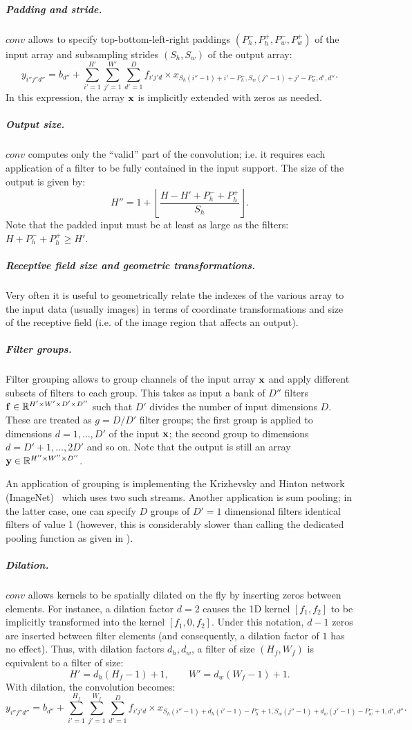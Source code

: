 \subparagraph{Padding and stride.} $conv$ allows to specify  top-bottom-left-right paddings $(P_h^-,P_h^+,P_w^-,P_w^+)$ of the input array and subsampling strides $(S_h,S_w)$ of the output array:
\[
y_{i''j''d''}
=
b_{d''}
+
\sum_{i'=1}^{H'}
\sum_{j'=1}^{W'}
\sum_{d'=1}^D
f_{i'j'd} \times x_{S_h (i''-1)+i'-P_h^-, S_w(j''-1)+j' - P_w^-,d',d''}.
\]
In this expression, the array $\mathbf{x}$ is implicitly extended with zeros as needed.

\subparagraph{Output size.} $conv$ computes only the ``valid'' part of the convolution; i.e. it requires each application of a filter to be fully contained in the input support.  The size of the output is given by:
\[
H'' = 1 + \left\lfloor \frac{H - H' + P_h^- + P_h^+}{S_h} \right\rfloor.
\]
Note that the padded input must be at least as large as the filters: $H +P_h^- + P_h^+ \geq H'$.

\subparagraph{Receptive field size and geometric transformations.} Very often it is useful to geometrically relate the indexes of the various array to the input data (usually images) in terms of coordinate transformations and size of the receptive field (i.e. of the image region that affects an output).

\subparagraph{Filter groups.} Filter grouping allows to group channels of the input array $\mathbf{x}$ and apply different subsets of filters to each group. This takes as input a bank of $D''$ filters $\mathbf{f}\in\mathbb{R}^{H'\times W'\times D'\times D''}$ such that $D'$ divides the number of input dimensions $D$. These are treated as $g=D/D'$ filter groups; the first group is applied to dimensions $d=1,\dots,D'$ of the input $\mathbf{x}$; the second group to dimensions $d=D'+1,\dots,2D'$ and so on. Note that the output is still an array $\mathbf{y}\in\mathbb{R}^{H''\times W''\times D''}$.

An application of grouping is implementing the Krizhevsky and Hinton network (ImageNet)~\cite{krizhevsky12imagenet} which uses two such streams. Another application is sum pooling; in the latter case, one can specify $D$ groups of $D'=1$ dimensional filters identical filters of value 1 (however, this is considerably slower than calling the dedicated pooling function as given in ).

\subparagraph{Dilation.} $conv$ allows kernels to be spatially dilated on the fly by inserting zeros between elements. For instance, a dilation factor $d=2$ causes the 1D kernel $[f_1,f_2]$ to be implicitly transformed into the kernel $[f_1,0,f_2]$. Under this notation, $d-1$ zeros are inserted between filter elements (and consequently, a dilation factor of $1$ has no effect). Thus, with dilation factors $d_h,d_w$, a filter of size $(H_f,W_f)$ is equivalent to a filter of size:
\[
H' = d_h(H_f - 1) + 1,
\qquad
W' = d_w(W_f - 1) + 1.
\]
With dilation, the convolution becomes:
\[
y_{i''j''d''}
=
b_{d''}
+
\sum_{i'=1}^{H_f}
\sum_{j'=1}^{W_f}
\sum_{d'=1}^D
f_{i'j'd} \times x_{
	S_h (i''-1)+d_h(i'-1)-P_h^-+1,
	S_w (j''-1)+d_w(j'-1)-P_w^-+1,
	d',d''}.
\]


